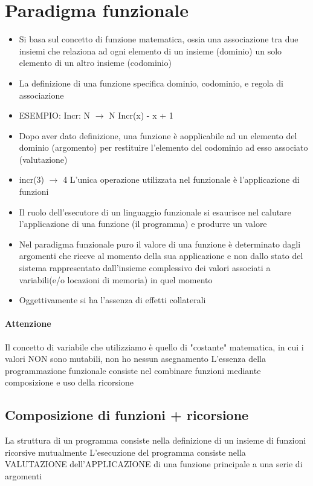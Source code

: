 \documentclass[12pt, a4paper, openany, oneside]{book}
\begin{document}
\section{Paradigma funzionale}
\begin{itemize}
	\item 
	Si basa sul concetto di funzione matematica, ossia una associazione tra due 
	insiemi che relaziona ad ogni elemento di un insieme (dominio) un solo 
	elemento di un altro insieme (codominio)
	\item La definizione di una funzione specifica dominio, codominio, e regola di associazione 
	\newline
	\item ESEMPIO: \newline
	Incr: N $\to$ N \newline
	Incr(x) - x + 1
	\item Dopo aver dato definizione, una funzione è aopplicabile ad un elemento del 
	dominio (argomento) per restituire l'elemento del codominio ad esso associato
	(valutazione)
	\item incr(3) $\to$ 4 
	L'unica operazione utilizzata nel funzionale è l'applicazione di funzioni  
	\item Il ruolo dell'esecutore di un linguaggio funzionale si esaurisce nel calutare l'applicazione di una funzione (il programma) e produrre un valore 
	\item Nel paradigma funzionale puro il valore di una funzione è determinato dagli argomenti che riceve al momento della sua applicazione e non dallo stato del sistema rappresentato dall'insieme complessivo dei valori associati a variabili(e/o locazioni di memoria) in quel momento 
	\item Oggettivamente si ha l'assenza di effetti collaterali \newline \newline
\end{itemize}
\paragraph{Attenzione} %
\label{par:attenzione}
Il concetto di variabile che utilizziamo è quello di "costante" matematica, in 
cui i valori NON sono mutabili, non ho nessun asegnamento
\newline \newline
L'essenza della programmazione funzionale consiste nel combinare funzioni mediante composizione e uso della ricorsione
\subsection{Composizione di funzioni + ricorsione} 
La struttura di un programma consiste nella definizione di un insieme di funzioni ricorsive mutualmente
\newline \newline
L'esecuzione del programma consiste nella VALUTAZIONE dell'APPLICAZIONE di una
funzione principale a una serie di argomenti
\end{document}

